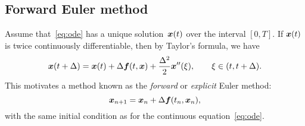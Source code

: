 \subsection{Forward Euler method}
\label{sub:explicit_euler}
Assume that~\eqref{eq:ode} has a unique solution~$\mathbf{\boldsymbol{x}}(t)$ over the interval $[0, T]$.
If $\mathbf{\boldsymbol{x}}(t)$ is twice continuously differentiable,
then by Taylor's formula,
we have
\begin{equation}
    \label{eq:taylor_forward}
    \mathbf{\boldsymbol{x}}(t + \Delta) = \mathbf{\boldsymbol{x}}(t) + \Delta \mathbf{\boldsymbol{f}}(t, \mathbf{\boldsymbol{x}}) + \frac{\Delta^2}{2} \mathbf{\boldsymbol{x}}''(\xi),
    \qquad \xi \in (t, t+\Delta).
\end{equation}
This motivates a method known as the \emph{forward} or \emph{explicit} Euler method:
\[
    \mathbf{\boldsymbol{x}}_{n+1} = \mathbf{\boldsymbol{x}}_{n} + \Delta \mathbf{\boldsymbol{f}}(t_n, \mathbf{\boldsymbol{x}}_n),
\]
with the same initial condition as for the continuous equation~\eqref{eq:ode}.

